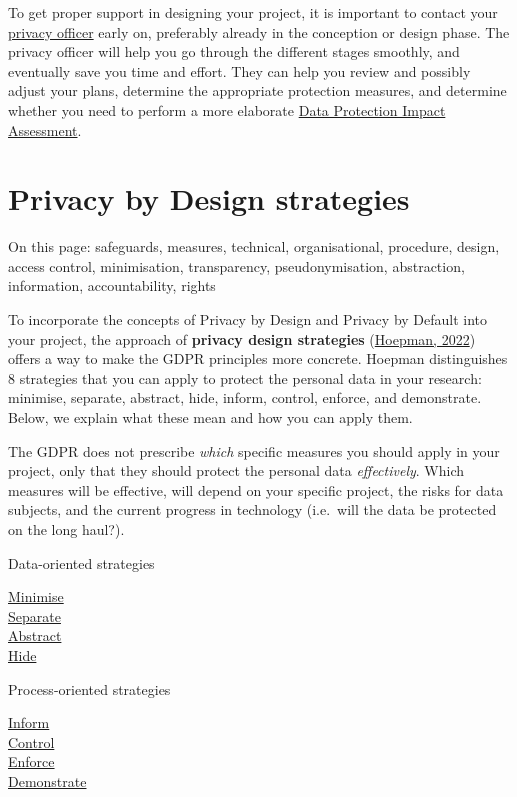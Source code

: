 \documentclass[
]{book}
\begin{document}
To get proper support in designing your project, it is important to contact your
\protect\hyperlink{support}{privacy officer} early on, preferably already in the conception or design phase. The privacy
officer will help you go through the different stages smoothly, and eventually
save you time and effort. They can help you review and possibly adjust your
plans, determine the appropriate protection measures, and determine whether you
need to perform a more elaborate \protect\hyperlink{dpia}{Data Protection Impact Assessment}.

\hypertarget{design-strategies}{%
\section{Privacy by Design strategies}\label{design-strategies}}

On this page: safeguards, measures, technical, organisational, procedure,
design, access control, minimisation, transparency, pseudonymisation,
abstraction, information, accountability, rights

To incorporate the concepts of Privacy by Design and Privacy by Default into
your project, the approach of \textbf{privacy design strategies}
(\href{https://www.cs.ru.nl/~jhh/publications/pds-booklet.pdf}{Hoepman, 2022})
offers a way to make the GDPR principles more concrete. Hoepman distinguishes 8
strategies that you can apply to protect the personal data in your research:
minimise, separate, abstract, hide, inform, control, enforce, and demonstrate.
Below, we explain what these mean and how you can apply them.

The GDPR does not prescribe \emph{which} specific measures you should apply in your
project, only that they should protect the personal data \emph{effectively}. Which
measures will be effective, will depend on your specific project, the risks for
data subjects, and the current progress in technology (i.e.~will the data be
protected on the long haul?).

Data-oriented strategies

\protect\hyperlink{minimise}{Minimise}\\
\protect\hyperlink{separate}{Separate}\\
\protect\hyperlink{abstract}{Abstract}\\
\protect\hyperlink{hide}{Hide}

Process-oriented strategies

\protect\hyperlink{inform}{Inform}\\
\protect\hyperlink{control}{Control}\\
\protect\hyperlink{enforce}{Enforce}\\
\protect\hyperlink{demonstrate}{Demonstrate}
\end{document}
